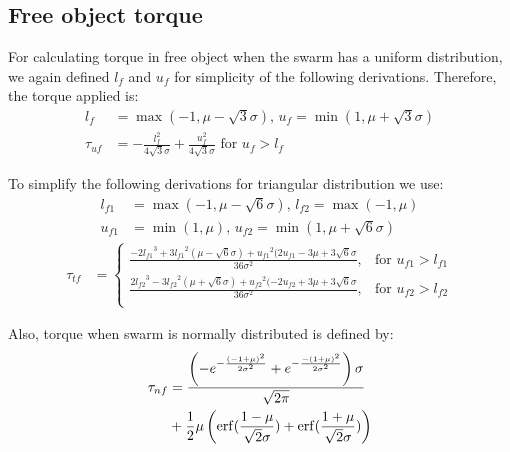 



\subsection{Free object torque}

For calculating torque in free object when the swarm has a uniform distribution, we again defined $l_f$ and $u_f$ for simplicity of the following derivations. Therefore, the torque applied is:
\begin{align}
l_f &= \max({-1,\mu -\sqrt{3} \sigma}),\, u_f = \min({1,\mu+\sqrt{3}\sigma})\\
\tau_{uf} &= -\frac{l_f^2}{4\sqrt{3}\sigma}+ \frac{u_f^2}{4\sqrt{3}\sigma} \textrm{  for    }  u_f>l_f
\end{align}

To simplify the following derivations for triangular distribution we use:
\begin{align}
l_{f1} &= \max({-1,\mu-\sqrt{6}\sigma}), \,l_{f2} = \max({-1,\mu})\\ \nonumber
u_{f1} &= \min({1,\mu}), \, u_{f2} = \min({1,\mu+\sqrt{6}\sigma}) \nonumber
\end{align}
\begin{align}
\tau_{tf} &=  \left\{
\begin{array}{ll}
\frac{-2{l_{f1}}^3+3{l_{f1}}^2(\mu-\sqrt{6}\sigma)+{u_{f1}}^2(2u_{f1} - 3\mu+3\sqrt{6}\sigma}{36\sigma^2}, &   \textrm{for     } u_{f1} > l_{f1}\\
\frac{2{l_{f2}}^3-3{l_{f2}}^2(\mu+\sqrt{6}\sigma)+{u_{f2}}^2(-2u_{f2} + 3\mu+3\sqrt{6}\sigma}{36\sigma^2}, &   \textrm{for     } u_{f2} > l_{f2}\\
\end{array} 
\right.
\end{align}

Also, torque when swarm is normally distributed is defined by:
\begin{align} \nonumber
\tau_{nf} &= \frac{\left(-e^{-\frac{(-1+\mu)^2}{2\sigma^2}}+e^{-\frac{-(1+\mu)^2}{2\sigma^2}}\right)\sigma}{\sqrt{2\pi}}\\
 &+ \frac{1}{2}\mu\left(\operatorname{erf}(\frac{1-\mu}{\sqrt{2}\sigma})+\operatorname{erf}(\frac{1+\mu}{\sqrt{2}\sigma})\right) 
\end{align}

